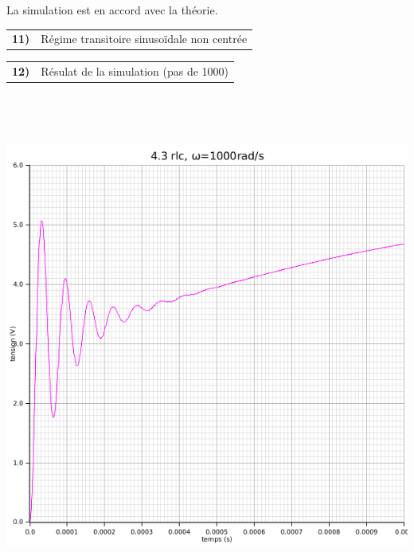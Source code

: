 \documentclass{article}
\newcommand{\question}[2]
{
    \begin{tabularx}{\linewidth}{lX}
        \textbf{#1)} & {#2}
    \end{tabularx} 
}
\begin{document}
{\begin{center}
    \end{center}

    La simulation est en accord avec la théorie.

    \question{11}{
      Régime transitoire sinusoïdale non centrée 
    }

    \question{12}{
      Résulat de la simulation (pas de 1000) 
    }

    \begin{center}
      \includegraphics[height=45em]{images/rlcsinus1e3.png}
    \end{center}
    \begin{center}

\end{center}}
\end{document}
